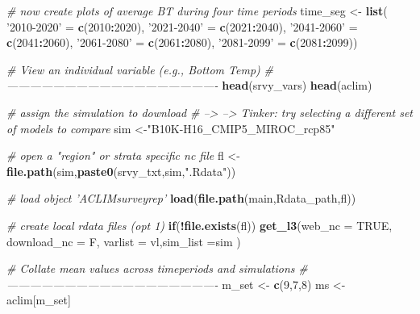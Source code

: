 \documentclass[
]{article}
\newenvironment{Shaded}{\begin{snugshade}}{\end{snugshade}}
\newcommand{\CommentTok}[1]{\textcolor[rgb]{0.56,0.35,0.01}{\textit{#1}}}
\newcommand{\ControlFlowTok}[1]{\textcolor[rgb]{0.13,0.29,0.53}{\textbf{#1}}}
\newcommand{\DataTypeTok}[1]{\textcolor[rgb]{0.13,0.29,0.53}{#1}}
\newcommand{\DecValTok}[1]{\textcolor[rgb]{0.00,0.00,0.81}{#1}}
\newcommand{\KeywordTok}[1]{\textcolor[rgb]{0.13,0.29,0.53}{\textbf{#1}}}
\newcommand{\NormalTok}[1]{#1}
\newcommand{\OperatorTok}[1]{\textcolor[rgb]{0.81,0.36,0.00}{\textbf{#1}}}
\newcommand{\OtherTok}[1]{\textcolor[rgb]{0.56,0.35,0.01}{#1}}
\newcommand{\StringTok}[1]{\textcolor[rgb]{0.31,0.60,0.02}{#1}}
\begin{document}
\begin{Shaded}
\begin{Highlighting}[]
    \CommentTok{# now create plots of average BT during four time periods}
\NormalTok{    time_seg   <-}\StringTok{ }\KeywordTok{list}\NormalTok{( }\StringTok{'2010-2020'}\NormalTok{ =}\StringTok{ }\KeywordTok{c}\NormalTok{(}\DecValTok{2010}\OperatorTok{:}\DecValTok{2020}\NormalTok{),}
                        \StringTok{'2021-2040'}\NormalTok{ =}\StringTok{ }\KeywordTok{c}\NormalTok{(}\DecValTok{2021}\OperatorTok{:}\DecValTok{2040}\NormalTok{),}
                        \StringTok{'2041-2060'}\NormalTok{ =}\StringTok{ }\KeywordTok{c}\NormalTok{(}\DecValTok{2041}\OperatorTok{:}\DecValTok{2060}\NormalTok{),}
                        \StringTok{'2061-2080'}\NormalTok{ =}\StringTok{ }\KeywordTok{c}\NormalTok{(}\DecValTok{2061}\OperatorTok{:}\DecValTok{2080}\NormalTok{),}
                        \StringTok{'2081-2099'}\NormalTok{ =}\StringTok{ }\KeywordTok{c}\NormalTok{(}\DecValTok{2081}\OperatorTok{:}\DecValTok{2099}\NormalTok{))}
  
    \CommentTok{# View an individual variable (e.g., Bottom Temp)}
    \CommentTok{# -------------------------------------------------------}
    \KeywordTok{head}\NormalTok{(srvy_vars)}
    \KeywordTok{head}\NormalTok{(aclim)}
    
    \CommentTok{# assign the simulation to download}
    \CommentTok{# --> --> Tinker: try selecting a different set of models to compare}
\NormalTok{    sim        <-}\StringTok{"B10K-H16_CMIP5_MIROC_rcp85"} 
    
    \CommentTok{# open a "region" or strata specific nc file}
\NormalTok{    fl         <-}\StringTok{ }\KeywordTok{file.path}\NormalTok{(sim,}\KeywordTok{paste0}\NormalTok{(srvy_txt,sim,}\StringTok{".Rdata"}\NormalTok{))}
    
    \CommentTok{# load object 'ACLIMsurveyrep'}
    \KeywordTok{load}\NormalTok{(}\KeywordTok{file.path}\NormalTok{(main,Rdata_path,fl))   }
     
    \CommentTok{# create local rdata files (opt 1)}
    \ControlFlowTok{if}\NormalTok{(}\OperatorTok{!}\KeywordTok{file.exists}\NormalTok{(fl))}
      \KeywordTok{get_l3}\NormalTok{(}\DataTypeTok{web_nc =} \OtherTok{TRUE}\NormalTok{, }\DataTypeTok{download_nc =}\NormalTok{ F,}
          \DataTypeTok{varlist =}\NormalTok{ vl,}\DataTypeTok{sim_list =}\NormalTok{sim )}
    
    
     \CommentTok{# Collate mean values across timeperiods and simulations}
    \CommentTok{# -------------------------------------------------------}
\NormalTok{    m_set      <-}\StringTok{ }\KeywordTok{c}\NormalTok{(}\DecValTok{9}\NormalTok{,}\DecValTok{7}\NormalTok{,}\DecValTok{8}\NormalTok{)}
\NormalTok{    ms         <-}\StringTok{ }\NormalTok{aclim[m_set]}
   

\end{Highlighting}
\end{Shaded}
\end{document}
